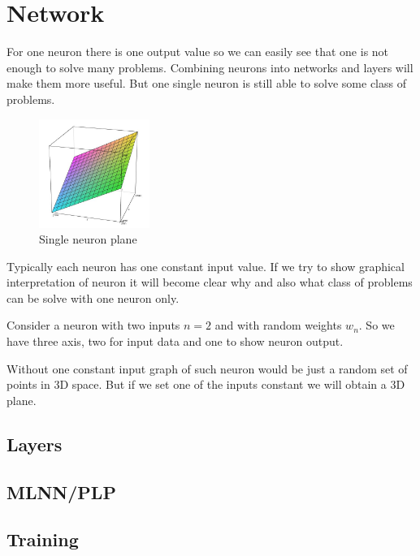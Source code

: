\section{Network}

For one neuron there is one output value so we can easily see that one is not enough to solve many problems. Combining neurons into networks and layers will make them more useful. But one single neuron is still able to solve some class of problems.

\begin{figure}
    \includegraphics[width=0.32\textwidth]{Media/Plane.png}
    \caption{Single neuron plane}
    \label{fig:Plane}
\end{figure}

Typically each neuron has one constant input value. If we try to show graphical interpretation of neuron it will become clear why and also what class of problems can be solve with one neuron only.

Consider a neuron with two inputs $n = 2$ and with random weights $w_n$. So we have three axis, two for input data and one to show neuron output.

Without one constant input graph of such neuron would be just a random set of points in 3D space. But if we set one of the inputs constant we will obtain a 3D plane.




\subsection{Layers}

\subsection{MLNN/PLP}

\subsection{Training}